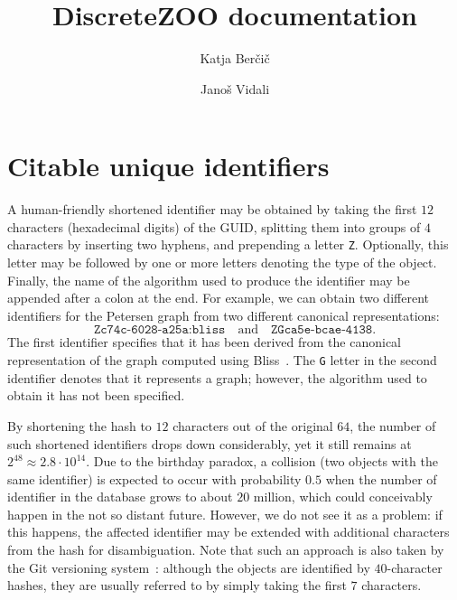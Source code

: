 \documentclass[12pt,a4paper]{article}
\begin{document}
\title{DiscreteZOO documentation}
\author{Katja Ber\v{c}i\v{c} \and  Jano\v{s} Vidali}
\maketitle

\section{Citable unique identifiers}

A human-friendly shortened identifier may be obtained
by taking the first $12$ characters (hexadecimal digits) of the GUID,
splitting them into groups of $4$ characters by inserting two hyphens,
and prepending a letter \texttt{Z}.
Optionally, this letter may be followed by one or more letters
denoting the type of the object.
Finally, the name of the algorithm used to produce the identifier
may be appended after a colon at the end.
For example, we can obtain two different identifiers for the Petersen graph
from two different canonical representations:
\begin{equation}
\texttt{Zc74c-6028-a25a:bliss} \quad \text{and} \quad \texttt{ZGca5e-bcae-4138}.
\end{equation}
The first identifier specifies that it has been derived
from the canonical representation of the graph
computed using Bliss~\cite{Bliss}.
The \texttt{G} letter in the second identifier
denotes that it represents a graph;
however, the algorithm used to obtain it has not been specified.

By shortening the hash to $12$ characters out of the original $64$,
the number of such shortened identifiers drops down considerably,
yet it still remains at $2^{48} \approx 2.8 \cdot 10^{14}$.
Due to the birthday paradox, a collision
(two objects with the same identifier)
is expected to occur with probability $0.5$
when the number of identifier in the database grows to about $20$ million,
which could conceivably happen in the not so distant future.
However, we do not see it as a problem:
if this happens, the affected identifier may be extended
with additional characters from the hash for disambiguation.
Note that such an approach
is also taken by the Git versioning system~\cite{git}:
although the objects are identified by $40$-character hashes,
they are usually referred to by simply taking the first $7$ characters.



\end{document}

